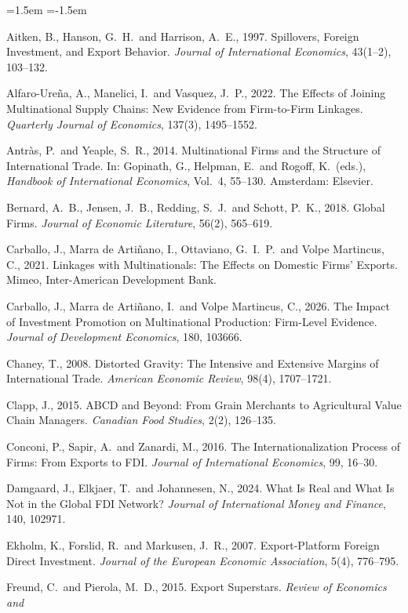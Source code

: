 \begin{list}{}{\leftmargin=1.5em \itemindent=-1.5em \itemsep=2pt \topsep=4pt}
\item Aitken, B., Hanson, G.\ H.\ and Harrison, A.\ E., 1997. Spillovers, Foreign Investment, and
Export Behavior. \emph{Journal of International Economics}, 43(1--2), 103--132.
\item Alfaro-Ure\~na, A., Manelici, I.\ and Vasquez, J.\ P., 2022. The Effects of Joining
Multinational Supply Chains: New Evidence from Firm-to-Firm Linkages. \emph{Quarterly Journal of
Economics}, 137(3), 1495--1552.
\item Antr\`as, P.\ and Yeaple, S.\ R., 2014. Multinational Firms and the Structure of
International Trade. In: Gopinath, G., Helpman, E.\ and Rogoff, K.\ (eds.), \emph{Handbook of
International Economics}, Vol.\ 4, 55--130. Amsterdam: Elsevier.
\item Bernard, A.\ B., Jensen, J.\ B., Redding, S.\ J.\ and Schott, P.\ K., 2018. Global Firms.
\emph{Journal of Economic Literature}, 56(2), 565--619.
\item Carballo, J., Marra de Arti\~nano, I., Ottaviano, G.\ I.\ P.\ and Volpe Martincus, C., 2021.
Linkages with Multinationals: The Effects on Domestic Firms' Exports. Mimeo, Inter-American
Development Bank.
\item Carballo, J., Marra de Arti\~nano, I.\ and Volpe Martincus, C., 2026. The Impact of Investment
Promotion on Multinational Production: Firm-Level Evidence. \emph{Journal of Development
Economics}, 180, 103666.
\item Chaney, T., 2008. Distorted Gravity: The Intensive and Extensive Margins of International
Trade. \emph{American Economic Review}, 98(4), 1707--1721.
\item Clapp, J., 2015. ABCD and Beyond: From Grain Merchants to Agricultural Value Chain Managers.
\emph{Canadian Food Studies}, 2(2), 126--135.
\item Conconi, P., Sapir, A.\ and Zanardi, M., 2016. The Internationalization Process of Firms: From
Exports to FDI. \emph{Journal of International Economics}, 99, 16--30.
\item Damgaard, J., Elkjaer, T.\ and Johannesen, N., 2024. What Is Real and What Is Not in the
Global FDI Network? \emph{Journal of International Money and Finance}, 140, 102971.
\item Ekholm, K., Forslid, R.\ and Markusen, J.\ R., 2007. Export-Platform Foreign Direct
Investment. \emph{Journal of the European Economic Association}, 5(4), 776--795.
\item Freund, C.\ and Pierola, M.\ D., 2015. Export Superstars. \emph{Review of Economics and
}
\end{list}
